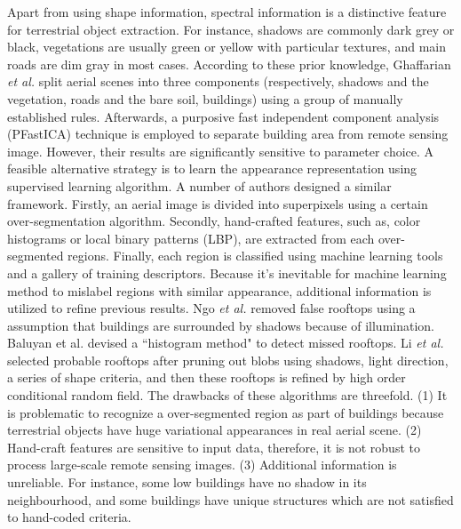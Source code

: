 \documentclass[runningheads]{llncs}
\begin{document}
   Apart from using shape information, spectral information is a distinctive feature for  terrestrial object extraction. For instance, shadows are commonly dark grey or black, vegetations are usually green or yellow with particular textures, and main roads are dim gray in most cases. According to these prior knowledge, Ghaffarian \textit{et al.} \cite{ghaffarian2014automaticPFICA} split aerial scenes into three components (respectively, shadows and the vegetation, roads and the bare soil, buildings) using a group of manually established rules. Afterwards, a purposive fast independent component analysis (PFastICA) technique is employed to separate building area from remote sensing image. However, their results are significantly sensitive to parameter choice. A feasible alternative strategy is to learn the appearance representation using  supervised learning algorithm. A number of authors \cite{chen2014shadow,ngoautomatic,baluyan2013novel,dornaika2015object} designed a similar framework. Firstly, an aerial image is divided into superpixels using  a certain over-segmentation algorithm. Secondly, hand-crafted features, such as, color histograms or local binary patterns (LBP), are extracted from each over-segmented regions. Finally, each region is classified using machine learning tools and a gallery of training descriptors.  Because it's inevitable for machine learning method to mislabel regions with similar appearance, additional information is utilized to refine previous results. Ngo \textit{et
al.} \cite{ngoautomatic} removed false rooftops using a assumption that buildings are surrounded by shadows because of illumination. Baluyan et al. \cite{baluyan2013novel} devised a ``histogram method" to detect missed rooftops. Li \textit{et al.} \cite{li2015robust} selected probable rooftops after pruning out blobs using shadows, light direction, a series of shape criteria, and then these rooftops is refined by high order conditional random field. The drawbacks of these algorithms are threefold. (1) It is problematic to recognize a over-segmented region as part of buildings because terrestrial objects have huge variational appearances in real aerial scene. (2) Hand-craft features are sensitive to input data, therefore, it is not robust to process large-scale remote sensing images. (3) Additional information is unreliable. For instance, some low buildings have no shadow in its neighbourhood, and some buildings have unique structures which are not satisfied to hand-coded criteria. 
\end{document}
